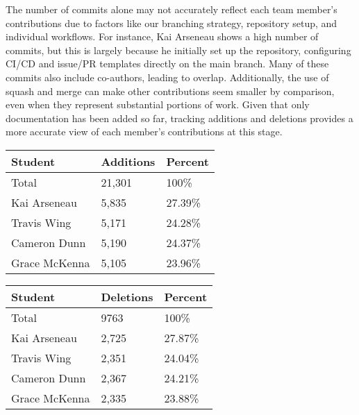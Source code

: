 \documentclass{article}
\begin{document}
The number of commits alone may not accurately reflect each team member’s contributions due to factors like our branching strategy, repository setup, and individual workflows. For instance, Kai Arseneau shows a high number of commits, but this is largely because he initially set up the repository, configuring CI/CD and issue/PR templates directly on the main branch. Many of these commits also include co-authors, leading to overlap. Additionally, the use of squash and merge can make other contributions seem smaller by comparison, even when they represent substantial portions of work. Given that only documentation has been added so far, tracking additions and deletions provides a more accurate view of each member's contributions at this stage.
\begin{table}[H]
  \centering
  \begin{tabular}{lll}
  \toprule
  \textbf{Student} & \textbf{Additions} & \textbf{Percent}\\
  \midrule
  Total & 21,301 & 100\% \\
  Kai Arseneau & 5,835 & 27.39\% \\
  Travis Wing & 5,171 & 24.28\% \\
  Cameron Dunn & 5,190 & 24.37\% \\
  Grace McKenna & 5,105 & 23.96\% \\
  \bottomrule
  \end{tabular}
\end{table}

\begin{table}[H]
  \centering
  \begin{tabular}{lll}
  \toprule
  \textbf{Student} & \textbf{Deletions} & \textbf{Percent}\\
  \midrule
  Total & 9763 & 100\% \\
  Kai Arseneau & 2,725 & 27.87\% \\
  Travis Wing & 2,351 & 24.04\% \\
  Cameron Dunn & 2,367 & 24.21\% \\
  Grace McKenna & 2,335 & 23.88\% \\
  \bottomrule
  \end{tabular}
\end{table}

\end{document}
